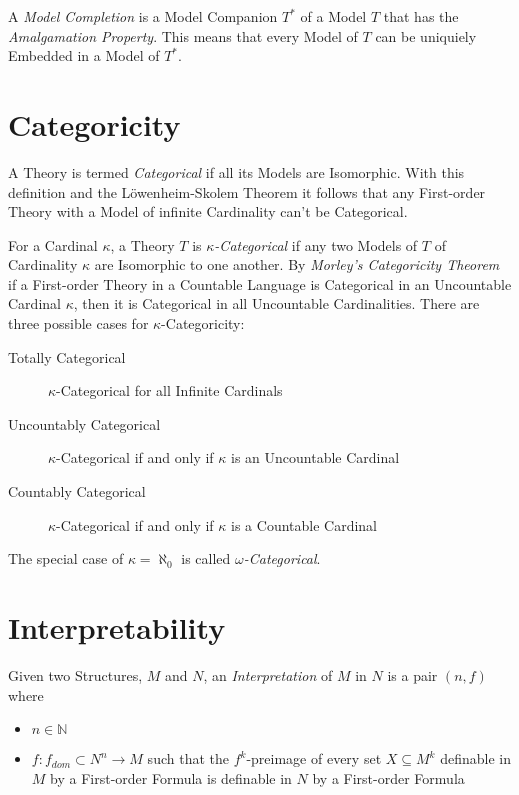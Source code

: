A \emph{Model Completion} is a Model Companion $T^*$ of a Model $T$
that has the \emph{Amalgamation Property}. This means that every Model
of $T$ can be uniquiely Embedded in a Model of $T^*$.



\section{Categoricity}

A Theory is termed \emph{Categorical} if all its Models are
Isomorphic. With this definition and the L\"owenheim-Skolem Theorem it
follows that any First-order Theory with a Model of infinite
Cardinality can't be Categorical.

For a Cardinal $\kappa$, a Theory $T$ is \emph{$\kappa$-Categorical}
if any two Models of $T$ of Cardinality $\kappa$ are Isomorphic to one
another. By \emph{Morley's Categoricity Theorem}\cite{morley65} if a
First-order Theory in a Countable Language is Categorical in an
Uncountable Cardinal $\kappa$, then it is Categorical in all
Uncountable Cardinalities. There are three possible cases for
$\kappa$-Categoricity:
\begin{description}
\item[Totally Categorical] $\kappa$-Categorical for all Infinite
  Cardinals
\item[Uncountably Categorical] $\kappa$-Categorical if and only if
  $\kappa$ is an Uncountable Cardinal
\item[Countably Categorical] $\kappa$-Categorical if and only if
  $\kappa$ is a Countable Cardinal
\end{description}
The special case of $\kappa = \aleph_0$ is called
\emph{$\omega$-Categorical}.



\section{Interpretability}

Given two Structures, $M$ and $N$, an \emph{Interpretation} of $M$ in
$N$ is a pair $(n,f)$ where
\begin{itemize}
    \item $n \in \mathbb{N}$
    \item $f:f_{dom} \subset N^n \rightarrow M$ such that the
      $f^k$-preimage of every set $X \subseteq M^k$ definable in $M$
      by a First-order Formula is definable in $N$ by a First-order
      Formula
\end{itemize}

